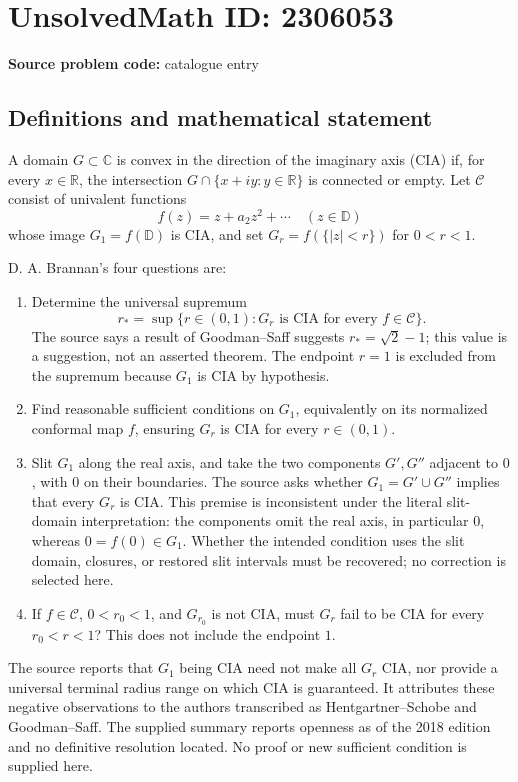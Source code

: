 \documentclass[11pt]{article}
\newcommand{\R}{\mathbb{R}}
\newcommand{\C}{\mathbb{C}}
\begin{document}
\section*{UnsolvedMath ID: 2306053}
\textbf{Source problem code:} catalogue entry
\subsection{Definitions and mathematical statement}
A domain $G\subset\C$ is convex in the direction of the imaginary axis (CIA) if, for every $x\in\R$, the intersection $G\cap\{x+iy:y\in\R\}$ is connected or empty. Let $\mathcal C$ consist of univalent functions
\[
f(z)=z+a_2z^2+\cdots\quad(z\in\mathbb D)
\]
whose image $G_1=f(\mathbb D)$ is CIA, and set $G_r=f(\{|z|<r\})$ for $0<r<1$.

D. A. Brannan's four questions are:
\begin{enumerate}
\item Determine the universal supremum
\[
r_* =\sup\{r\in(0,1):G_r\text{ is CIA for every }f\in\mathcal C\}.
\]
The source says a result of Goodman--Saff suggests $r_*=\sqrt2-1$; this value is a suggestion, not an asserted theorem. The endpoint $r=1$ is excluded from the supremum because $G_1$ is CIA by hypothesis.
\item Find reasonable sufficient conditions on $G_1$, equivalently on its normalized conformal map $f$, ensuring $G_r$ is CIA for every $r\in(0,1)$.
\item Slit $G_1$ along the real axis, and take the two components $G',G''$ adjacent to $0$, with $0$ on their boundaries. The source asks whether $G_1=G'\cup G''$ implies that every $G_r$ is CIA. This premise is inconsistent under the literal slit-domain interpretation: the components omit the real axis, in particular $0$, whereas $0=f(0)\in G_1$. Whether the intended condition uses the slit domain, closures, or restored slit intervals must be recovered; no correction is selected here.
\item If $f\in\mathcal C$, $0<r_0<1$, and $G_{r_0}$ is not CIA, must $G_r$ fail to be CIA for every $r_0<r<1$? This does not include the endpoint $1$.
\end{enumerate}
The source reports that $G_1$ being CIA need not make all $G_r$ CIA, nor provide a universal terminal radius range on which CIA is guaranteed. It attributes these negative observations to the authors transcribed as Hentgartner--Schobe and Goodman--Saff. The supplied summary reports openness as of the 2018 edition and no definitive resolution located. No proof or new sufficient condition is supplied here.
\end{document}
